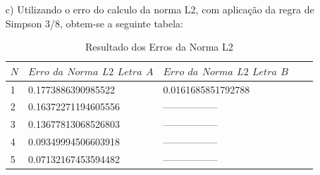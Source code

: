 \documentclass{article}
\begin{document}
\begin{itemize}
\begin{itemize}
\item[c)] Utilizando o erro do calculo da norma L2, com aplicação da regra de Simpson 3/8, obtem-se a seguinte tabela:

\begin{table}[h]
\centering
  \begin{tabular}{|l|l|l|ll}
   $N$ & $Erro$ $da$ $Norma$ $L2$ $Letra$ $A$ & $Erro$ $da$ $Norma$ $L2$ $Letra$ $B$ \\
    \hline
    1 &   0.1773886390985522 & 0.0161685851792788 \\
    2 &   0.16372271194605556 & ----------------- \\
    3 &   0.13677813068526803 & ----------------- \\
    4 &   0.09349994506603918 & ----------------- \\
    5 &   0.07132167453594482 & ----------------- \\
    \hline
  \end{tabular}
  \caption{Resultado dos Erros da Norma L2}
\end{table}

\end{itemize}

\end{itemize}
\end{document}
